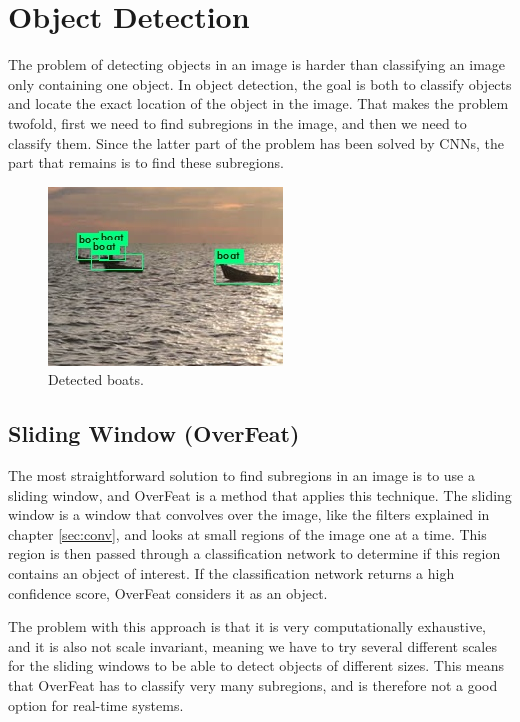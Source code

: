 


\chapter{Object Detection}
\label{sec:obj_det}
The problem of detecting objects in an image is harder than classifying an image only containing one object. In object detection, the goal is both to classify objects and locate the exact location of the object in the image. That makes the problem twofold, first we need to find subregions in the image, and then we need to classify them. Since the latter part of the problem has been solved by CNNs, the part that remains is to find these subregions. 

\begin{figure}[h!]
    \centering
    \includegraphics[scale=0.8]{images/predictions2.jpg}
    \caption{Detected boats.}
    \label{fig:boat_detection}
\end{figure}


\section{Sliding Window (OverFeat)}
The most straightforward solution to find subregions in an image is to use a sliding window, and OverFeat \citep{Sermanet2013} is a method that applies this technique. The sliding window is a window that convolves over the image, like the filters explained in chapter \ref{sec:conv}, and looks at small regions of the image one at a time. This region is then passed through a classification network to determine if this region contains an object of interest. If the classification network returns a high confidence score, OverFeat considers it as an object. 

\vspace{3mm}

The problem with this approach is that it is very computationally exhaustive, and it is also not scale invariant, meaning we have to try several different scales for the sliding windows to be able to detect objects of different sizes. This means that OverFeat has to classify very many subregions, and is therefore not a good option for real-time systems.


